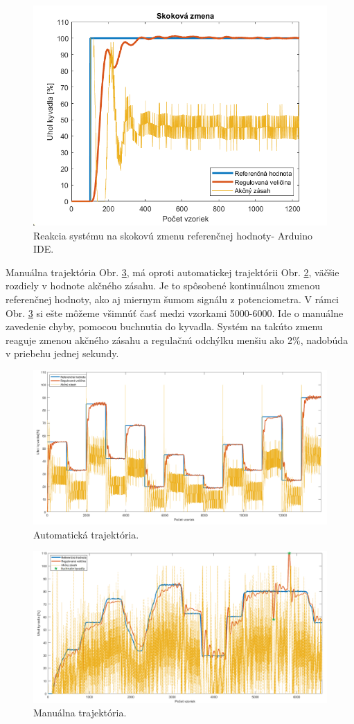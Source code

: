\begin{figure}[!tbh]
	\centering
	\includegraphics[width=120mm]{obr/SkokovaZmena.png}
	\caption{Reakcia systému na skokovú zmenu referenčnej hodnoty- Arduino IDE.}\label{OBRAZOK 2.5.1}
\end{figure}

Manuálna trajektória Obr. \ref{OBRAZOK 2.5.3}, má oproti automatickej trajektórii Obr. \ref{OBRAZOK 2.5.2}, väčšie rozdiely v hodnote akčného zásahu. Je to spôsobené kontinuálnou zmenou referenčnej hodnoty, ako aj miernym šumom signálu z potenciometra. V rámci Obr. \ref{OBRAZOK 2.5.3} si ešte môžeme všimnúť časť medzi vzorkami 5000-6000. Ide o manuálne zavedenie chyby, pomocou buchnutia do kyvadla. Systém na takúto zmenu reaguje zmenou akčného zásahu a regulačnú odchýlku menšiu ako 2\%, nadobúda v priebehu jednej sekundy. 

\begin{figure}[!tbh]
	\centering
	\includegraphics[width=150mm]{obr/Auto3.png}
	\caption{Automatická trajektória.}\label{OBRAZOK 2.5.2}
\end{figure}

\begin{figure}[!tbh]
	\centering
	\includegraphics[width=150mm]{obr/potentio.png}
	\caption{Manuálna trajektória.}\label{OBRAZOK 2.5.3}
\end{figure}
